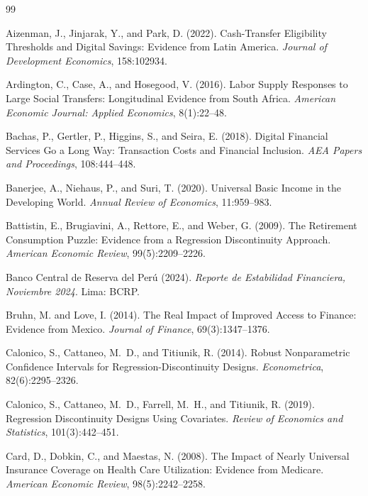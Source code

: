 \documentclass[12pt]{article}
\begin{document}
\begin{thebibliography}{99}

Aizenman, J., Jinjarak, Y., and Park, D. (2022).
Cash-Transfer Eligibility Thresholds and Digital Savings: Evidence from Latin America.
\textit{Journal of Development Economics}, 158:102934.

Ardington, C., Case, A., and Hosegood, V. (2016).
Labor Supply Responses to Large Social Transfers: Longitudinal Evidence from South Africa.
\textit{American Economic Journal: Applied Economics}, 8(1):22--48.

Bachas, P., Gertler, P., Higgins, S., and Seira, E. (2018).
Digital Financial Services Go a Long Way: Transaction Costs and Financial Inclusion.
\textit{AEA Papers and Proceedings}, 108:444--448.

Banerjee, A., Niehaus, P., and Suri, T. (2020).
Universal Basic Income in the Developing World.
\textit{Annual Review of Economics}, 11:959--983.

Battistin, E., Brugiavini, A., Rettore, E., and Weber, G. (2009).
The Retirement Consumption Puzzle: Evidence from a Regression Discontinuity Approach.
\textit{American Economic Review}, 99(5):2209--2226.

Banco Central de Reserva del Per\'u (2024).
\textit{Reporte de Estabilidad Financiera, Noviembre 2024}.
Lima: BCRP.

Bruhn, M. and Love, I. (2014).
The Real Impact of Improved Access to Finance: Evidence from Mexico.
\textit{Journal of Finance}, 69(3):1347--1376.

Calonico, S., Cattaneo, M.~D., and Titiunik, R. (2014).
Robust Nonparametric Confidence Intervals for Regression-Discontinuity Designs.
\textit{Econometrica}, 82(6):2295--2326.

Calonico, S., Cattaneo, M.~D., Farrell, M.~H., and Titiunik, R. (2019).
Regression Discontinuity Designs Using Covariates.
\textit{Review of Economics and Statistics}, 101(3):442--451.

Card, D., Dobkin, C., and Maestas, N. (2008).
The Impact of Nearly Universal Insurance Coverage on Health Care Utilization: Evidence from Medicare.
\textit{American Economic Review}, 98(5):2242--2258.


\end{thebibliography}
\end{document}
